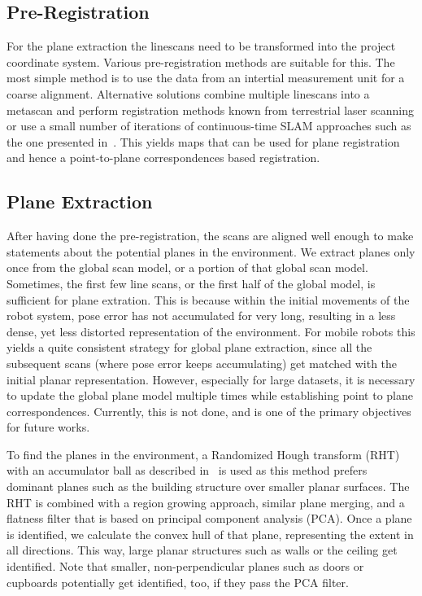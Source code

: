 \subsection{Pre-Registration}

For the plane extraction the linescans need to be transformed into the project coordinate system.
Various pre-registration methods are suitable for this.
The most simple method is to use the data from an intertial measurement unit for a coarse alignment.
Alternative solutions combine multiple linescans into a metascan and perform registration methods known from terrestrial laser scanning  or use a small number of iterations of continuous-time SLAM approaches such as the one presented in~\cite{REMSEN2013}.
This yields maps that can be used for plane registration and hence a point-to-plane correspondences based registration.

\subsection{Plane Extraction}

After having done the pre-registration, the scans are aligned well enough to make statements about the potential planes in the environment.
We extract planes only once from the global scan model, or a portion of that global scan model.
Sometimes, the first few line scans, or the first half of the global model, is sufficient for plane extration.
This is because within the initial movements of the robot system, pose error has not accumulated for very long, resulting in a less dense, yet less distorted representation of the environment.
For mobile robots this yields a quite consistent strategy for global plane extraction, since all the subsequent scans (where pose error keeps accumulating) get matched with the initial planar representation.
However, especially for large datasets, it is necessary to update the global plane model multiple times while establishing point to plane correspondences.  
Currently, this is not done, and is one of the primary objectives for future works.

To find the planes in the environment, a Randomized Hough transform (RHT) with an accumulator ball as described in~\cite{3DRESEARCH2011} is used as this method prefers dominant planes such as the building structure over smaller planar surfaces.
The RHT is combined with a region growing approach, similar plane merging, and a flatness filter that is based on principal component analysis (PCA).
Once a plane is identified, we calculate the convex hull of that plane, representing the extent in all directions. 
This way, large planar structures such as walls or the ceiling get identified.
Note that smaller, non-perpendicular planes such as doors or cupboards potentially get identified, too, if they pass the PCA filter.

